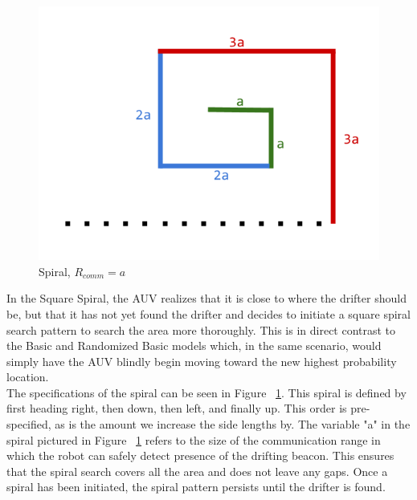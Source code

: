 \documentclass[a4paper, 11pt]{article} %
\begin{document}
\begin{figure}
	\vspace{-20pt}
	\begin{center}
		\includegraphics[scale=0.30]{spiral.png}
		\vspace{-20pt}
	\end{center}
\caption{Spiral, $R_{comm} = a$ \label{spiral}}

\end{figure}

\noindent In the Square Spiral, the AUV realizes that it is close to where the drifter should be, but that it has not yet found the drifter and decides to initiate a square spiral search pattern to search the area more thoroughly. This is in direct contrast to the Basic and Randomized Basic models which, in the same scenario, would simply have the AUV blindly begin moving toward the new highest probability location.\\

\noindent The specifications of the spiral can be seen in Figure ~\ref{spiral}. This spiral is defined by first heading right, then down, then left, and finally up. This order is pre-specified, as is the amount we increase the side lengths by. The variable "a" in the spiral pictured in Figure ~\ref{spiral} refers to the size of the communication range in which the robot can safely detect presence of the drifting beacon. This ensures that the spiral search covers all the area and does not leave any gaps. Once a spiral has been initiated, the spiral pattern persists until the drifter is found. 
\end{document}
